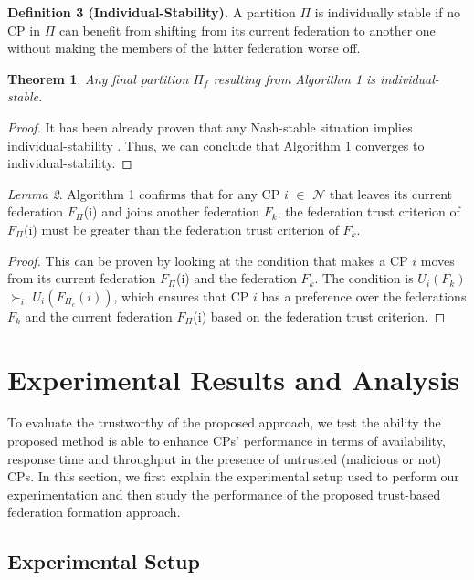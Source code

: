 \documentclass[preprint]{elsarticle}
\newtheorem{theorem}{Theorem}
\theoremstyle{definition}
\theoremstyle{remark}
\newtheorem{lemma}[theorem]{Lemma}
\theoremstyle{property}
\begin{document}
\textbf{Definition 3 (Individual-Stability).} A partition $\Pi$ is individually
stable if no CP in $\Pi$ can benefit from shifting from its current
federation to another one without making the members of the latter federation worse off.

\begin{theorem}
Any final partition $\Pi_{f}$ resulting from
Algorithm 1 is individual-stable.
\end{theorem}

\begin{proof}
It has been already proven that any Nash-stable situation implies individual-stability \cite{bogomolnaia2002stability}. Thus, we can conclude that Algorithm 1
converges to individual-stability.

\end{proof}

\begin{lemma}
Algorithm 1 confirms that for any CP $i$ $\in$ $\mathcal{N}$ that leaves its current federation $F_{\Pi}$(i) and joins another federation $F_{k}$, the federation trust criterion of $F_{\Pi}$(i) must be greater than the federation trust criterion of $F_{k}$.
\end{lemma}

\begin{proof}
This can be proven by looking at the condition that makes a CP $i$ moves from its current federation $F_{\Pi}$(i) and the federation $F_{k}$. The condition is $U_{i}(F_{k})$ $\succ_{i}$ $U_{i}(F_{\Pi_{c}}(i))$, which ensures that CP $i$ has a preference over the federations $F_{k}$ and the current federation $F_{\Pi}$(i) based on the federation trust criterion.

\end{proof}

\section{Experimental Results and Analysis}

To evaluate the trustworthy of the proposed approach, we test the ability the proposed method is able to enhance CPs' performance in terms of availability, response time and throughput in the presence of untrusted (malicious or not) CPs. In this section, we first explain the experimental setup
used to perform our experimentation and then study the performance of the proposed trust-based federation formation approach.

\subsection{Experimental Setup}
\end{document}
